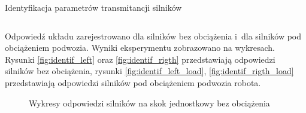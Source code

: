 \documentclass[11pt]{article}
\begin{document}
\begin{listing}[htb]
\caption{Identyfikacja parametrów transmitancji silników}
\inputminted[firstline=34, lastline=55, frame=lines, linenos, breaklines]{matlab}{../Identification/Identification.m}
\label{lst:mot_identif}
\end{listing}
 
Odpowiedź układu zarejestrowano dla silników bez obciążenia i~dla silników pod obciążeniem podwozia.
Wyniki eksperymentu zobrazowano na wykresach. Rysunki \ref{fig:identif_left} oraz \ref{fig:identif_rigth} przedstawiają odpowiedzi silników bez obciążenia, rysunki \ref{fig:identif_left_load}, \ref{fig:identif_rigth_load} przedstawiają odpowiedzi silników pod obciążeniem podwozia robota.

\begin{figure}[!htbp] 
	\quad 
	\caption{Wykresy odpowiedzi silników na skok jednostkowy bez obciążenia} 
\end{figure}
\end{document}
